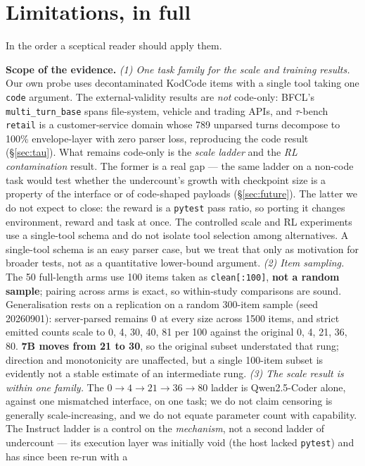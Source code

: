 \section{Limitations, in full}
\label{app:limitations}

In the order a sceptical reader should apply them.

\textbf{Scope of the evidence.}
\emph{(1) One task family for the scale and training results.} Our own probe uses decontaminated
KodCode items with a single tool taking one \texttt{code} argument. The external-validity results
are \emph{not} code-only: BFCL's \texttt{multi\_turn\_base} spans file-system, vehicle and trading
APIs, and $\tau$-bench \texttt{retail} is a customer-service domain whose 789 unparsed turns
decompose to 100\% envelope-layer with zero parser loss, reproducing the code result
(\S\ref{sec:tau}). What remains code-only is the \emph{scale ladder} and the \emph{RL
contamination} result. The former is a real gap --- the same ladder on a non-code task would test
whether the undercount's growth with checkpoint size is a property of the interface or of
code-shaped payloads (\S\ref{sec:future}). The latter we do not expect to close: the reward is a
\texttt{pytest} pass ratio, so porting it changes environment, reward and task at once. The controlled
scale and RL experiments use a single-tool schema and do not isolate tool selection among
alternatives. A single-tool schema is
an easy parser case, but we treat that only as motivation for broader tests, not as a quantitative
lower-bound argument.
\emph{(2) Item sampling.} The 50 full-length arms use 100 items taken as \texttt{clean[:100]},
\textbf{not a random sample}; pairing across arms is exact, so within-study comparisons are sound.
Generalisation rests on a replication on a random 300-item sample (seed 20260901): server-parsed
remains 0 at every size across 1500 items, and strict emitted counts scale to 0, 4, 30, 40, 81 per
100 against the original 0, 4, 21, 36, 80. \textbf{7B moves from 21 to 30}, so the original subset
understated that rung; direction and monotonicity are unaffected, but a single 100-item subset is
evidently not a stable estimate of an intermediate rung.
\emph{(3) The scale result is within one family.} The $0\to4\to21\to36\to80$ ladder is
Qwen2.5-Coder alone, against one mismatched interface, on one task; we do not claim censoring is
generally scale-increasing, and we do not equate parameter count with capability. The Instruct
ladder is a control on the \emph{mechanism}, not a second ladder of undercount --- its execution
layer was initially void (the host lacked \texttt{pytest}) and has since been re-run with a
